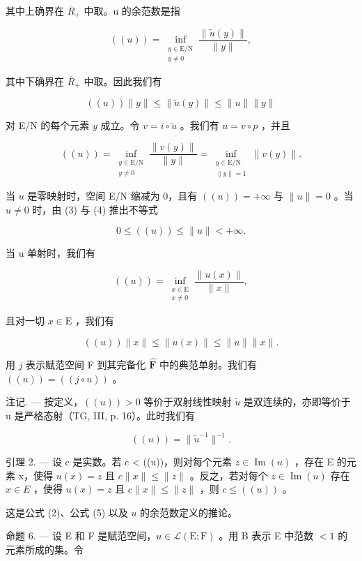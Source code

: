 其中上确界在 \(\overline{R}_{+}\) 中取。u 的余范数是指

\[
((u)) = \inf_{\substack{y\in \mathrm{E} / \mathrm{N}\\ y\neq 0}}\frac{\| \widetilde{u}(y)\|}{\|y\|},\tag{4}
\]

其中下确界在 \(\overline{R}_{+}\) 中取。因此我们有

\[
((u)) \| y \| \leqslant \| \widetilde {u} (y) \| \leqslant \| u \| \| y \|\tag{5}
\]

对 E/N 的每个元素 \(y\) 成立。令 \(v = i \circ \widetilde{u}\) 。我们有 \(u = v \circ p\) ，并且

\[
((u)) = \inf_{\substack{y\in \mathrm{E / N}\\ y\neq 0}}\frac{\|v(y)\|}{\|y\|} = \inf_{\substack{y\in \mathrm{E / N}\\ \|y\| = 1}}\| v(y)\| .\tag{6}
\]

当 \(u\) 是零映射时，空间 E/N 缩减为 0，且有 \(((u)) = +\infty\) 与 \(\| u \| = 0\) 。当 \(u \neq 0\) 时，由 (3) 与 (4) 推出不等式

\[
0 \leqslant ((u)) \leqslant \| u \| <   + \infty .\tag{7}
\]

当 u 单射时，我们有

\[
((u)) = \inf_{\substack{x\in \mathrm{E}\\ x\neq 0}}\frac{\|u(x)\|}{\|x\|},\tag{8}
\]

且对一切 \(x \in \mathrm{E}\) ，我们有

\[
((u)) \| x \| \leqslant \| u (x) \| \leqslant \| u \| \| x \|.\tag{9}
\]

用 \(j\) 表示赋范空间 F 到其完备化 \(\widehat{\mathbf{F}}\) 中的典范单射。我们有 \(((u)) = ((j \circ u))\) 。

注记. --- 按定义，\(((u)) > 0\) 等价于双射线性映射 \(\widetilde{u}\) 是双连续的，亦即等价于 u 是严格态射（TG, III, p. 16）。此时我们有

\[
((u)) = \| \widetilde {u} ^ {- 1} \| ^ {- 1}.\tag{10}
\]

引理 2. --- 设 c 是实数。若 c \textless{} ((u))，则对每个元素 \(z \in \operatorname{Im}(u)\) ，存在 E 的元素 x，使得 \(u(x) = z\) 且 \(c \|x\| \leqslant \|z\|\) 。反之，若对每个 \(z \in \operatorname{Im}(u)\) 存在 \(x \in E\) ，使得 \(u(x) = z\) 且 \(c \|x\| \leqslant \|z\|\) ，则 \(c \leqslant ((u))\) 。

这是公式 (2)、公式 (5) 以及 \(u\) 的余范数定义的推论。

命题 6. --- 设 E 和 F 是赋范空间，\(u \in \mathcal{L}(\mathrm{E};\mathrm{F})\) 。用 B 表示 E 中范数 \(< 1\) 的元素所成的集。令

